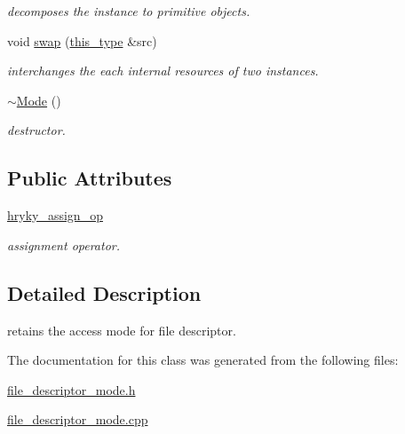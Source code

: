 \begin{DoxyCompactItemize}
\begin{DoxyCompactList}\small\item\em decomposes the instance to primitive objects. \end{DoxyCompactList}\item 
\hypertarget{classhryky_1_1file_1_1descriptor_1_1_mode_a294fd4f518b15bb59bedba3d5c2484bb}{void \hyperlink{classhryky_1_1file_1_1descriptor_1_1_mode_a294fd4f518b15bb59bedba3d5c2484bb}{swap} (\hyperlink{classhryky_1_1file_1_1descriptor_1_1_mode_a06dd006ab194ebabae7e2b324246df44}{this\-\_\-type} \&src)}\label{classhryky_1_1file_1_1descriptor_1_1_mode_a294fd4f518b15bb59bedba3d5c2484bb}

\begin{DoxyCompactList}\small\item\em interchanges the each internal resources of two instances. \end{DoxyCompactList}\item 
\hypertarget{classhryky_1_1file_1_1descriptor_1_1_mode_a4ba0ea00e138073c98a8f4a2b7194d92}{\hyperlink{classhryky_1_1file_1_1descriptor_1_1_mode_a4ba0ea00e138073c98a8f4a2b7194d92}{$\sim$\-Mode} ()}\label{classhryky_1_1file_1_1descriptor_1_1_mode_a4ba0ea00e138073c98a8f4a2b7194d92}

\begin{DoxyCompactList}\small\item\em destructor. \end{DoxyCompactList}\end{DoxyCompactItemize}
\subsection*{Public Attributes}
\begin{DoxyCompactItemize}
\item 
\hypertarget{classhryky_1_1file_1_1descriptor_1_1_mode_a2668dae2a013ae1932819d22a121adb8}{\hyperlink{classhryky_1_1file_1_1descriptor_1_1_mode_a2668dae2a013ae1932819d22a121adb8}{hryky\-\_\-assign\-\_\-op}}\label{classhryky_1_1file_1_1descriptor_1_1_mode_a2668dae2a013ae1932819d22a121adb8}

\begin{DoxyCompactList}\small\item\em assignment operator. \end{DoxyCompactList}\end{DoxyCompactItemize}


\subsection{Detailed Description}
retains the access mode for file descriptor. 

The documentation for this class was generated from the following files\-:\begin{DoxyCompactItemize}
\item 
\hyperlink{file__descriptor__mode_8h}{file\-\_\-descriptor\-\_\-mode.\-h}\item 
\hyperlink{file__descriptor__mode_8cpp}{file\-\_\-descriptor\-\_\-mode.\-cpp}\end{DoxyCompactItemize}
